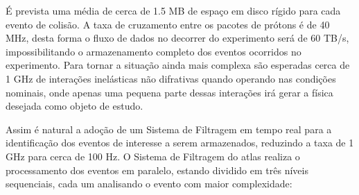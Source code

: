 
É prevista uma média de cerca de 1.5 MB de espaço em disco rígido para cada evento de 
colisão. A taxa de cruzamento entre os pacotes de prótons é de 40 MHz, 
desta forma o fluxo de dados no decorrer do experimento será de 60 TB/s, impossibilitando o
armazenamento completo dos eventos ocorridos no experimento. Para tornar a
situação ainda mais complexa são esperadas cerca de 1 GHz de interações
inelásticas não difrativas \cite{resumo_ATLAS} quando operando nas condições nominais, onde apenas
uma pequena parte dessas interações irá gerar a física desejada como objeto de
estudo.

Assim é natural a adoção de um Sistema de Filtragem em tempo real para a
identificação dos eventos de interesse a serem armazenados, reduzindo a taxa de 1 GHz
para cerca de 100 Hz. O Sistema de Filtragem do \gls{atlas} realiza o processamento dos 
eventos em paralelo, estando dividido em três níveis sequenciais, cada um 
analisando o evento com maior complexidade:


